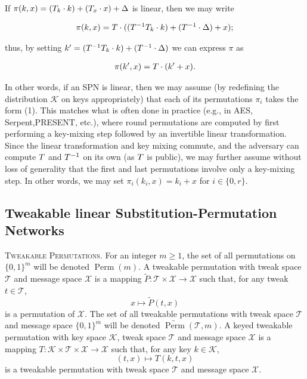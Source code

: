 If $\pi(k,x) = (\mathnormal{T}_{k} \cdot k) + (\mathnormal{T}_{x} \cdot x) + \Delta$ is linear, then we may write

$$
\begin{aligned}
\pi(k,x) = \mathnormal{T} \cdot ((\mathnormal{T}^{-1} \mathnormal{T}_{k} \cdot k) + (\mathnormal{T}^{-1} \cdot \Delta) + x);
\end{aligned}
$$

thus, by setting $k^{\prime} = (\mathnormal{T}^{-1} \mathnormal{T}_{k} \cdot k) + (\mathnormal{T}^{-1} \cdot \Delta)$  we can express $\pi$ as

\begin{equation}
\begin{aligned}
\pi(k^{\prime},x) = \mathnormal{T} \cdot (k^{\prime} + x).
\end{aligned}
\end{equation}

In other words, if an SPN is linear, then we may assume (by redefining the distribution $\mathcal{K}$  on keys appropriately) that each of its permutations $\pi_{i}$ takes the
form (1). This matches what is often done in practice (e.g., in AES, Serpent,PRESENT, etc.), where round permutations are computed by first performing a key-mixing step followed by an invertible linear transformation. Since the linear transformation and key mixing commute, and the adversary can compute $\mathnormal{T}$ and $\mathnormal{T}^{-1}$ on its own (as  $\mathnormal{T}$ is public), we may further assume without loss of generality that the first and last permutations involve only a key-mixing step. In other words, we may set
$\pi_{i}(k_{i},x) = k_{i} + x$ for $i \in \{0,r\}$.


\subsection{Tweakable linear Substitution-Permutation Networks}
\textsc{Tweakable Permutations.} For an integer $m \geq 1$, the set of all permutations
on $\{0,1\}^{m}$ will be denoted $\operatorname{Perm}(m)$. A tweakable permutation with tweak space $\mathcal{T}$ and message space $\mathcal{X}$ is a mapping $\widetilde{P} :\mathcal{T} \times \mathcal{X} \rightarrow \mathcal{X}$ such that, for any tweak $t \in \mathcal{T}$,
$$
x \mapsto \widetilde{P}(t,x)
$$
\noindent is a permutation of $\mathcal{X}$. The set of all tweakable permutations with tweak space $\mathcal{T}$ and message space $\{0,1\}^{m}$ will be denoted $\widetilde{\operatorname{Perm}}(\mathcal{T}, m)$.
  A keyed tweakable permutation with key space $\mathcal{K}$, tweak space $\mathcal{T}$ and message space $\mathcal{X}$ is a mapping $T : \mathcal{K} \times \mathcal{T} \times \mathcal{X} \rightarrow \mathcal{X}$ such that, for any key $k \in \mathcal{K}$,
$$
(t,x) \mapsto T(k,t,x)
$$
\noindent is a tweakable permutation with tweak space $\mathcal{T}$ and message space $\mathcal{X}$.\\

